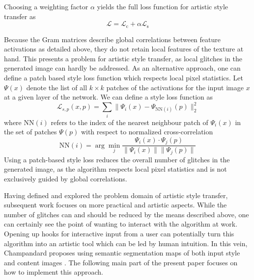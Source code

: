 Choosing a weighting factor \(\alpha\) yields the full loss function for artistic style transfer as 
\[\mathcal{L} = \mathcal{L}_\text{c}+\alpha \mathcal{L}_\text{s}\]

Because the Gram matrices describe global correlations between feature activations as detailed above, they do not retain local features of the texture at hand. This presents a problem for artistic style transfer, as local glitches in the generated image can hardly be addressed. As an alternative approach, one can define a patch based style loss function \cite{mrf2016} which respects local pixel statistics. Let \(\Psi(x)\) denote the list of all \(k\times k\) patches of the activations for the input image \(x\) at a given layer of the network. We can define a style loss function as
\[\mathcal{L}_{s,p}(x,p) = \sum_i \|\Psi_i(x)-\Psi_{\text{NN}(i)}(p)\|_2^2\]
where \(\text{NN}(i)\) refers to the index of the nearest neighbour patch of \(\Psi_i(x)\) in the set of patches \(\Psi(p)\) with respect to normalized cross-correlation
\[\text{NN}(i) = \arg\min_{j} \frac{\Psi_i(x)\cdot \Psi_j(p)}{\|\Psi_i(x)\|\|\Psi_j(p)\|}\]
Using a patch-based style loss reduces the overall number of glitches in the generated image, as the algorithm respects local pixel statistics and is not exclusively guided by global correlations.

Having defined and explored the problem domain of artistic style transfer, subsequent work focuses on more practical and artistic aspects. While the number of glitches can and should be reduced by the means described above, one can certainly see the point of wanting to interact with the algorithm at work. Opening up hooks for interactive input from a user can potentially turn this algorithm into an artistic tool which can be led by human intuition. In this vein, Champandard proposes using semantic segmentation maps of both input style and content images \cite{doodles2016}. The following main part of the present paper focuses on how to implement this approach.





